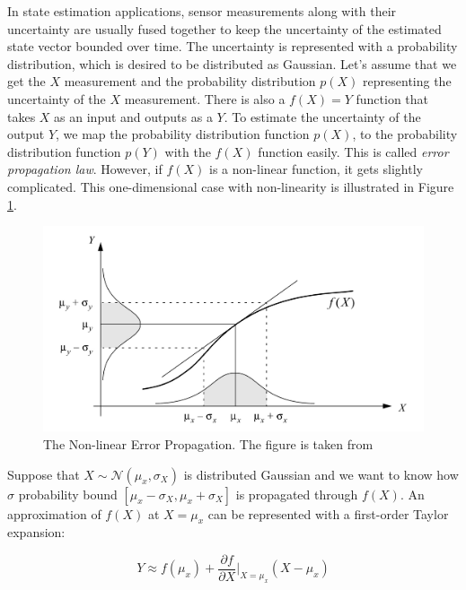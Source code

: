 \documentclass[12pt]{report}
\numberwithin{figure}{section}
\begin{document}
\begin{appendices}
In state estimation applications, sensor measurements along with their uncertainty are 
usually fused together to keep the uncertainty of the estimated state vector 
bounded 
over time. 
The uncertainty is represented with a probability distribution, 
which is desired to be distributed as Gaussian. 
Let's assume that we get the $X$ measurement and the probability distribution 
$p(X)$ representing the uncertainty of the $X$ measurement. 
There is also a $f(X)=Y$ function that takes $X$ as an input and outputs 
as a $Y$. 
To estimate the uncertainty of the output $Y$, 
we map the probability distribution function $p(X)$, 
to the probability distribution function $p(Y)$ with the $f(X)$ function 
easily.
This is called 
\textit{error propagation law}. However, if $f(X)$ is a non-linear function, 
it gets slightly complicated. This one-dimensional case with non-linearity is 
illustrated in Figure \ref{fig:error_propagation}.

\begin{figure}[H]
	\centering
	\includegraphics[width=\linewidth,natwidth=640,natheight=640]
	{fig/ref_imgs/error_propagation.jpg}
\caption[The Non-linear Error Propagation]
{The Non-linear Error Propagation. The figure is taken from 
\parencite{Arras1998b}}
  \label{fig:error_propagation}
\end{figure}

Suppose that $X\sim \mathcal{N}(\mu_x, \sigma_X)$ is distributed Gaussian 
and we want to know how $\sigma$ probability bound 
$[\mu_x-\sigma_X, \mu_x+\sigma_X]$ is propagated through $f(X)$.
An approximation of $f(X)$ at $X=\mu_x$ can be represented with 
a first-order Taylor expansion:

\begin{equation}
  Y \approx f(\mu_x) + \frac{\partial f}{\partial X}\bigg|_{X=\mu_x} (X-\mu_x) 
\end{equation}


\end{appendices}
\end{document}

